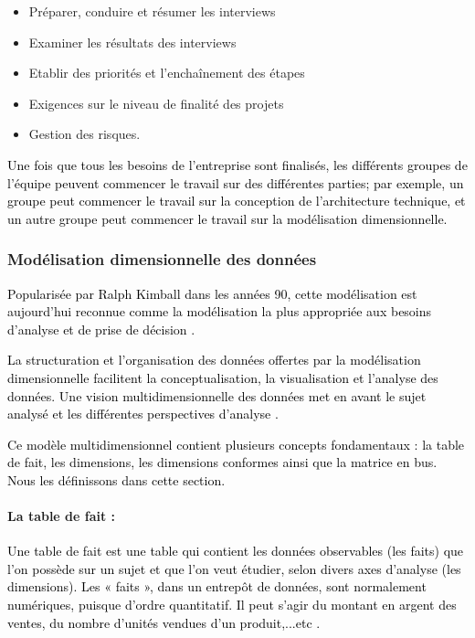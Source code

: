 \documentclass[a4paper,12pt]{report}
\begin{document}
\begin{itemize}
\item	Préparer, conduire et résumer les interviews
\item	Examiner les résultats des interviews
\item	Etablir des priorités et l’enchaînement des étapes
\item	Exigences sur le niveau de finalité des projets
\item	Gestion des risques.  
\end{itemize}

\textcolor{black}{Une fois que tous les besoins de l'entreprise sont finalisés, les différents groupes de l'équipe peuvent commencer le travail sur des différentes parties; par exemple, un groupe peut commencer le travail sur la conception de l'architecture technique, et un autre groupe peut commencer le travail sur la modélisation dimensionnelle.}

\subsubsection{	Modélisation dimensionnelle des données}

\textcolor{black}{Popularisée par Ralph Kimball dans les années 90, cette modélisation est aujourd’hui reconnue comme la modélisation la plus appropriée aux besoins d’analyse et de prise de décision \citep{adamson2012mastering}.}

\textcolor{black}{La structuration et l’organisation des données offertes par la modélisation dimensionnelle facilitent la conceptualisation, la visualisation et l’analyse des données. Une vision multidimensionnelle des données met en avant le sujet analysé et les différentes perspectives d’analyse \citep{kimball2013data}. }

\textcolor{black}{Ce modèle multidimensionnel contient plusieurs concepts fondamentaux : la table de fait, les dimensions, les dimensions conformes ainsi que la matrice en bus. Nous les définissons dans cette section.}


\paragraph{La table de fait : }
\textcolor{black}{Une table de fait est une table qui contient les données observables (les faits) que l'on possède sur un sujet et que l'on veut étudier, selon divers axes d'analyse (les dimensions). Les « faits », dans un entrepôt de données, sont normalement numériques, puisque d'ordre quantitatif. Il peut s'agir du montant en argent des ventes, du nombre d'unités vendues d'un produit,...etc .}
\end{document}
